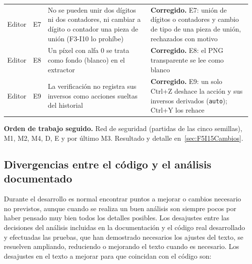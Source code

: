 \begin{xltabular}{\textwidth}{l c >{\RaggedRight\arraybackslash}X >{\RaggedRight\arraybackslash}X}
	Editor & E7 & No se pueden unir dos dígitos ni dos contadores, ni cambiar a dígito o contador una pieza de unión (F3-I10 lo prohíbe) & \textbf{Corregido.} E7: unión de dígitos o contadores y cambio de tipo de una pieza de unión, rechazados con motivo \\
	Editor & E8 & Un píxel con alfa 0 se trata como fondo (blanco) en el extractor & \textbf{Corregido.} E8: el PNG transparente se lee como blanco \\
	Editor & E9 & La verificación no registra sus inversos como acciones sueltas del historial & \textbf{Corregido.} E9: un solo Ctrl+Z deshace la acción y sus inversos derivados (\texttt{auto}); Ctrl+Y los rehace \\
	\bottomrule
\end{xltabular}

\textbf{Orden de trabajo seguido.} Red de seguridad (partidas de las cinco semillas), M1, M2, M4, D, E y por último M3. Resultado y detalle en~\ref{sec:F5I15Cambios}.

\subsection{Divergencias entre el código y el análisis documentado}
\label{sec:F5I15Docs}

Durante el desarrollo es normal encontrar puntos a mejorar o cambios necesario no previstos, aunque cuando se realiza un buen análisis son siempre pocos por haber pensado muy bien todos los detalles posibles. Los desajustes entre las decisiones del análisis incluidas en la documentación y el código real desarrollado y efectuadas las pruebas, que han demostrado necesarios los ajustes del texto, se resuelven ampliando, reduciendo o mejorando el texto cuando es necesario. Los desajustes en el texto a mejorar para que coincidan con el código son:

